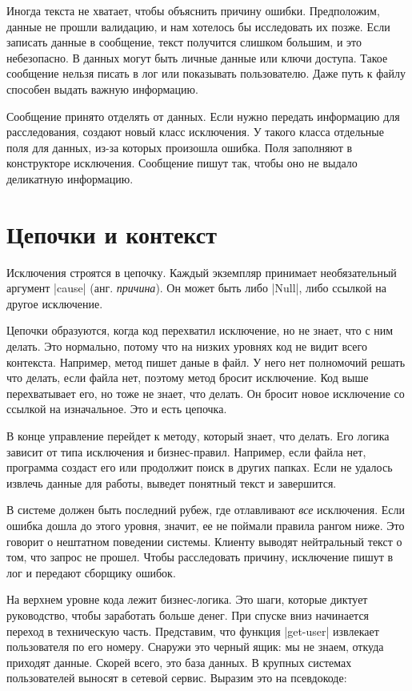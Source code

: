 Иногда текста не хватает, чтобы объяснить причину ошибки. Предположим, данные не
прошли валидацию, и нам хотелось бы исследовать их позже. Если записать данные в
сообщение, текст получится слишком большим, и это небезопасно. В данных могут
быть личные данные или ключи доступа. Такое сообщение нельзя писать в лог или
показывать пользователю. Даже путь к файлу способен выдать важную информацию.

Сообщение принято отделять от данных. Если нужно передать информацию для
расследования, создают новый класс исключения. У такого класса отдельные поля
для данных, из-за которых произошла ошибка. Поля заполняют в конструкторе
исключения. Сообщение пишут так, чтобы оно не выдало деликатную информацию.

\section{Цепочки и контекст}

Исключения строятся в цепочку. Каждый экземпляр принимает необязательный
аргумент \spverb|cause| (анг. \emph{причина}). Он может быть либо \spverb|Null|,
либо ссылкой на другое исключение.

Цепочки образуются, когда код перехватил исключение, но не знает, что с ним
делать. Это нормально, потому что на низких уровнях код не видит всего
контекста. Например, метод пишет даные в файл. У него нет полномочий решать что
делать, если файла нет, поэтому метод бросит исключение. Код выше перехватывает
его, но тоже не знает, что делать. Он бросит новое исключение со ссылкой на
изначальное. Это и есть цепочка.

В конце управление перейдет к методу, который знает, что делать. Его логика
зависит от типа исключения и бизнес-правил. Например, если файла нет, программа
создаст его или продолжит поиск в других папках. Если не удалось извлечь данные
для работы, выведет понятный текст и завершится.

В системе должен быть последний рубеж, где отлавливают \emph{все}
исключения. Если ошибка дошла до этого уровня, значит, ее не поймали правила
рангом ниже. Это говорит о нештатном поведении системы. Клиенту выводят
нейтральный текст о том, что запрос не прошел. Чтобы расследовать причину,
исключение пишут в лог и передают сборщику ошибок.

На верхнем уровне кода лежит бизнес-логика. Это шаги, которые диктует
руководство, чтобы заработать больше денег. При спуске вниз начинается переход в
техническую часть. Представим, что функция \spverb|get-user| извлекает
пользователя по его номеру. Снаружи это черный ящик: мы не знаем, откуда
приходят данные. Скорей всего, это база данных. В крупных системах пользователей
выносят в сетевой сервис. Выразим это на псевдокоде:

